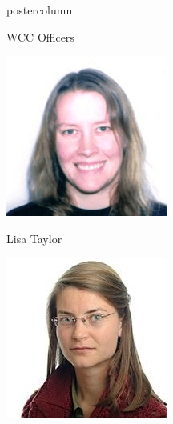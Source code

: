 \documentclass{beamer}
\begin{document}
\begin{frame}
\begin{columns}
\begin{column}{.33\textwidth}
\begin{beamercolorbox}[center,wd=\textwidth]{postercolumn}
\begin{minipage}[T]{.95\textwidth}
{\begin{myblock}{WCC Officers}
\begin{addmargin}[1em]{1em}
\begin{minipage}{0.3\linewidth}
                                \includegraphics[width=\linewidth]{img/lisa.png}
                                \centerline{Lisa Taylor}
                            \end{minipage}
                            \hspace{0.1cm}
                            \begin{minipage}{0.3\linewidth}
                                \includegraphics[width=\linewidth]{img/hannah.jpg}

\end{minipage}
\end{addmargin}
\end{myblock}}
\end{minipage}
\end{beamercolorbox}
\end{column}
\end{columns}
\end{frame}
\end{document}
